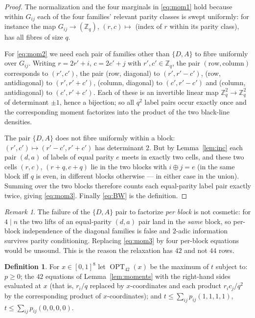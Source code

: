\documentclass[11pt]{amsart}
\theoremstyle{definition}
\newtheorem{definition}[theorem]{Definition}
\theoremstyle{remark}
\newtheorem{remark}[theorem]{Remark}
\newcommand{\Z}{\mathbb{Z}}
\newcommand{\OPT}{\operatorname{OPT}_{42}}
\begin{document}
\begin{proof}
The normalization and the four marginals in \eqref{eq:mom1} hold because within $G_{ij}$ each of the four families' relevant parity classes is swept uniformly: for instance the map $G_{ij}\to(\Z_q)$, $(r,c)\mapsto$ (index of $r$ within its parity class), has all fibres of size $q$.

For \eqref{eq:mom2} we need each pair of families other than $\{D,A\}$ to fibre uniformly over $G_{ij}$. Writing $r=2r'+i$, $c=2c'+j$ with $r',c'\in\Z_q$, the pair $(\text{row},\text{column})$ corresponds to $(r',c')$, the pair (row, diagonal) to $(r',r'-c')$, (row, antidiagonal) to $(r',r'+c')$, (column, diagonal) to $(c',r'-c')$ and (column, antidiagonal) to $(c',r'+c')$. Each of these is an invertible linear map $\Z_q^2\to\Z_q^2$ of determinant $\pm1$, hence a bijection; so all $q^2$ label pairs occur exactly once and the corresponding moment factorizes into the product of the two black-line densities.

The pair $\{D,A\}$ does not fibre uniformly within a block: $(r',c')\mapsto(r'-c',r'+c')$ has determinant $2$. But by Lemma~\ref{lem:inc} each pair $(d,a)$ of labels of equal parity $e$ meets in exactly two cells, and these two cells $(r,c)$, $(r+q,c+q)$ lie in the two blocks with $i\oplus j=e$ (in the same block iff $q$ is even, in different blocks otherwise --- in either case in the union). Summing over the two blocks therefore counts each equal-parity label pair exactly twice, giving \eqref{eq:mom3}. Finally \eqref{eq:BW} is the definition.
\end{proof}

\begin{remark}
The failure of the $\{D,A\}$ pair to factorize \emph{per block} is not cosmetic: for $4\mid n$ the two lifts of an equal-parity $(d,a)$ pair land in the \emph{same} block, so per-block independence of the diagonal families is false and $2$-adic information survives parity conditioning. Replacing \eqref{eq:mom3} by four per-block equations would be unsound. This is the reason the relaxation has $42$ and not $44$ rows.
\end{remark}

\begin{definition}\label{def:OPT}
For $x\in[0,1]^8$ let $\OPT(x)$ be the maximum of $t$ subject to: $p\ge0$; the $42$ equations of Lemma~\ref{lem:moments} with the right-hand sides evaluated at $x$ (that is, $r_i/q$ replaced by $x$-coordinates and each product $r_ic_j/q^2$ by the corresponding product of $x$-coordinates); and $t\le\sum_{ij}p_{ij}(1,1,1,1)$, $t\le\sum_{ij}p_{ij}(0,0,0,0)$.
\end{definition}
\end{document}
